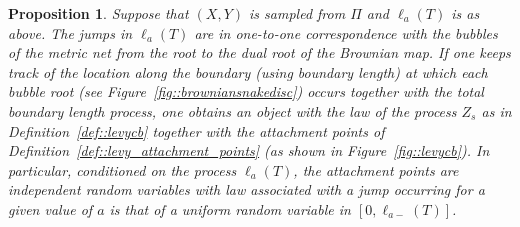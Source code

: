 \documentclass[JEP,XML,SOM,Unicode]{cedram}
\theoremstyle{plain}
\numberwithin{theorem}{section}
\newtheorem{proposition}[theorem]{Proposition}
\theoremstyle{definition}
\let\snakeexcursionmeasure \Pi
\begin{document}
\begin{proposition}
\label{prop::jumpsoneone}
Suppose that $(X,Y)$ is sampled from $\snakeexcursionmeasure$ and $\ell_a(T)$ is as above. The jumps in $\ell_a(T)$ are in one-to-one correspondence with the bubbles of the metric net from the root to the dual root of the Brownian map. If one keeps track of the location along the boundary (using boundary length) at which each bubble root (see Figure~\ref{fig::browniansnakedisc}) occurs together with the total boundary length process, one obtains an object with the law of the process $Z_s$ as in Definition~\ref{def::levycb} together with the attachment points of Definition~\ref{def::levy_attachment_points} (as shown in Figure~\ref{fig::levycb}). In particular, conditioned on the process $\ell_a(T)$, the attachment points are independent random variables with law associated with a jump occurring for a given value of $a$ is that of a uniform random variable in $[0,\ell_{a-}(T)]$.
\end{proposition}
\end{document}
